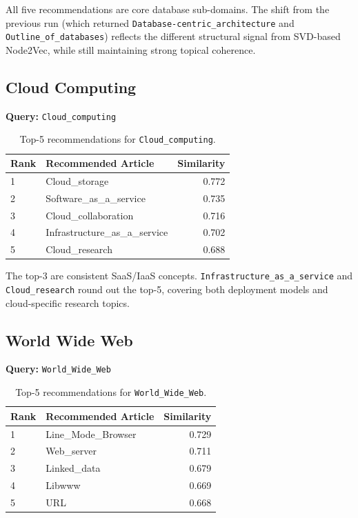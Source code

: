 \documentclass[12pt,a4paper]{article}
\begin{document}
All five recommendations are core database sub-domains.  The shift from the
previous run (which returned \texttt{Database-centric\_architecture} and
\texttt{Outline\_of\_databases}) reflects the different structural signal from
SVD-based Node2Vec, while still maintaining strong topical coherence.

\subsection{Cloud Computing}

\textbf{Query:} \texttt{Cloud\_computing}

\begin{table}[H]
\centering
\caption{Top-5 recommendations for \texttt{Cloud\_computing}.}
\label{tab:cloud}
\begin{tabular}{llr}
\toprule
\textbf{Rank} & \textbf{Recommended Article} & \textbf{Similarity} \\
\midrule
1 & Cloud\_storage & 0.772 \\
2 & Software\_as\_a\_service & 0.735 \\
3 & Cloud\_collaboration & 0.716 \\
4 & Infrastructure\_as\_a\_service & 0.702 \\
5 & Cloud\_research & 0.688 \\
\bottomrule
\end{tabular}
\end{table}

The top-3 are consistent SaaS/IaaS concepts.  \texttt{Infrastructure\_as\_a\_service}
and \texttt{Cloud\_research} round out the top-5, covering both deployment models
and cloud-specific research topics.

\subsection{World Wide Web}

\textbf{Query:} \texttt{World\_Wide\_Web}

\begin{table}[H]
\centering
\caption{Top-5 recommendations for \texttt{World\_Wide\_Web}.}
\label{tab:www}
\begin{tabular}{llr}
\toprule
\textbf{Rank} & \textbf{Recommended Article} & \textbf{Similarity} \\
\midrule
1 & Line\_Mode\_Browser & 0.729 \\
2 & Web\_server & 0.711 \\
3 & Linked\_data & 0.679 \\
4 & Libwww & 0.669 \\
5 & URL & 0.668 \\
\bottomrule
\end{tabular}
\end{table}
\end{document}
